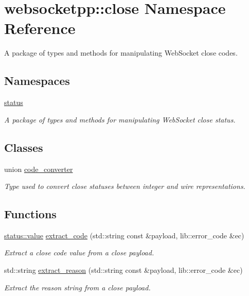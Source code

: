 \hypertarget{namespacewebsocketpp_1_1close}{}\section{websocketpp\+:\+:close Namespace Reference}
\label{namespacewebsocketpp_1_1close}


A package of types and methods for manipulating Web\+Socket close codes.  


\subsection*{Namespaces}
\begin{DoxyCompactItemize}
\item 
 \hyperlink{namespacewebsocketpp_1_1close_1_1status}{status}
\begin{DoxyCompactList}\small\item\em A package of types and methods for manipulating Web\+Socket close status\textquotesingle{}. \end{DoxyCompactList}\end{DoxyCompactItemize}
\subsection*{Classes}
\begin{DoxyCompactItemize}
\item 
union \hyperlink{unionwebsocketpp_1_1close_1_1code__converter}{code\+\_\+converter}
\begin{DoxyCompactList}\small\item\em Type used to convert close statuses between integer and wire representations. \end{DoxyCompactList}\end{DoxyCompactItemize}
\subsection*{Functions}
\begin{DoxyCompactItemize}
\item 
\hyperlink{namespacewebsocketpp_1_1close_1_1status_a8614a5c4733d708e2d2a32191c5bef84}{status\+::value} \hyperlink{namespacewebsocketpp_1_1close_aa47dacf7d2e13705d1f68d9ab5b9dad0}{extract\+\_\+code} (std\+::string const \&payload, lib\+::error\+\_\+code \&ec)
\begin{DoxyCompactList}\small\item\em Extract a close code value from a close payload. \end{DoxyCompactList}\item 
std\+::string \hyperlink{namespacewebsocketpp_1_1close_a537f66833c7b6e745b3cf5dc0252c0ca}{extract\+\_\+reason} (std\+::string const \&payload, lib\+::error\+\_\+code \&ec)
\begin{DoxyCompactList}\small\item\em Extract the reason string from a close payload. \end{DoxyCompactList}\end{DoxyCompactItemize}


